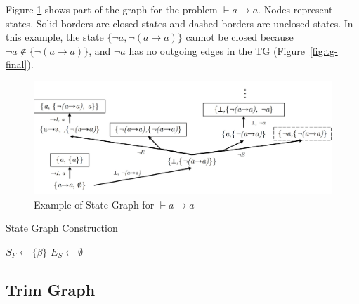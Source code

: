 \documentclass[runningheads]{llncs}
\begin{document}
Figure \ref{fig:st-ex} shows part of the graph for the problem \(\vdash a \to a\). Nodes represent states. Solid borders are closed states and dashed borders are unclosed states. In this example, the state $\{\lnot a, \lnot(a \to a)\}$ cannot be closed because $\lnot a \notin \{\lnot(a \to a)\}$, and $\lnot a$ has no outgoing edges in the TG (Figure~\ref{fig:tg-final}).

\begin{figure}
    \centering
    \includegraphics[width=1\linewidth]{resources/sg-gen.jpg}
    \caption{Example of State Graph for \(\vdash a \to a\)}
    \label{fig:st-ex}
\end{figure}

\begin{algorithm}
\caption{State Graph Construction}

$S_F \leftarrow \{\beta\}$ 
$E_S \leftarrow \emptyset$ 

\end{algorithm}

\subsection{Trim Graph}
\end{document}
